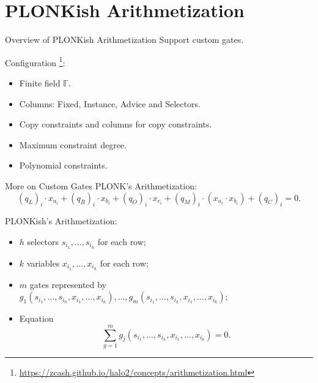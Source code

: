 \documentclass{beamer}
\begin{document}
	\section{PLONKish Arithmetization}
	\begin{frame}{Overview of PLONKish Arithmetization}
		Support custom gates.
		
		Configuration \footnote{\url{https://zcash.github.io/halo2/concepts/arithmetization.html}}:
		\begin{itemize}
			\item Finite field $\mathbb{F}$.
			\item Columns: Fixed, Instance, Advice and Selectors.
			\item Copy constraints and columns for copy constraints.
			\item Maximum constraint degree.
			\item Polynomial constraints.
			
		\end{itemize}
	\end{frame}

	\begin{frame}{More on Custom Gates}
		PLONK's Arithmetization:
		$$
			(q_L)_i \cdot x_{a_i} + (q_R)_i \cdot x_{b_i} + (q_O)_i \cdot x_{c_i} + (q_M)_i \cdot (x_{a_i} \cdot x_{b_i}) + (q_C)_i = 0.
		$$
		
		PLONKish's Arithmetization:
		\begin{itemize}
			\item $h$ selectors $s_{i_1}, \dots, s_{i_h}$ for each row;
			\item $k$ variables $x_{i_1}, \dots, x_{i_h}$ for each row;
			\item $m$ gates represented by $g_1(s_{i_1}, \dots, s_{i_h}, x_{i_1}, \dots, x_{i_h}), \dots, g_m(s_{i_1}, \dots, s_{i_h}, x_{i_1}, \dots, x_{i_k})$;
			\item Equation
			$$
				\sum_{g = 1}^m g_j(s_{i_1}, \dots, s_{i_h}, x_{i_1}, \dots, x_{i_k}) = 0.
			$$ 
		\end{itemize}
	\end{frame}
\end{document}
